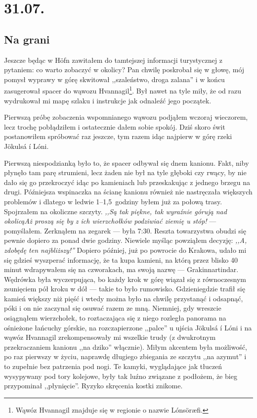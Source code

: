 \chapter*{31.07.}

\section*{Na grani}

Jeszcze będąc w Höfn zawitałem do tamtejszej informacji turystycznej z pytaniem: co warto zobaczyć w okolicy? Pan chwilę poskrobał się w głowę, mój pomysł wyprawy w górę  skwitował ,,szaleństwo, droga zalana'' i w końcu zasugerował spacer do wąwozu Hvannagil\footnote{Wąwóz Hvannagil znajduje się w regionie o nazwie Lónsöræfi.}. Był nawet na tyle miły, że od razu wydrukował mi mapę szlaku i instrukcje jak odnaleźć jego początek.

Pierwszą próbę zobaczenia wspomnianego wąwozu podjąłem wczoraj wieczorem, lecz trochę pobłądziłem i ostatecznie dałem sobie spokój. Dziś skoro świt postanowiłem spróbować raz jeszcze, tym razem idąc najpierw w górę rzeki Jökulsá í Lóni.

Pierwszą niespodzianką było to, że spacer odbywał się dnem kanionu. Fakt, niby płynęło tam parę strumieni, lecz żaden nie był na tyle głęboki czy rwący, by nie dało się go przekroczyć idąc po kamieniach lub przeskakując z jednego brzegu na drugi. Późniejsza wspinaczka na ścianę kanionu również nie nastręczała większych problemów i dlatego w ledwie \mbox{1--1,5 godziny} byłem już za połową trasy. Spojrzałem na okoliczne szczyty. \emph{,,Są tak piękne, tak wyraźnie górują nad okolicą\textellipsis Aż proszą się by z ich wierzchołków podziwiać ziemię u stóp!} --- pomyślałem. Zerknąłem na zegarek --- była 7:30. Reszta towarzystwa obudzi się pewnie dopiero za ponad dwie godziny. Niewiele myśląc powziąłem decyzję: \emph{,,A, zdobędę ten najbliższy!''} Dopiero później, już po powrocie do Krakowa, udało mi się gdzieś wyszperać informację, że ta kupa kamieni, na którą przez blisko 40 minut wdrapywałem się na czworakach, ma swoją nazwę --- Grakinnartindar. Wędrówka była wyczerpująca, bo każdy krok w górę wiązał się z równoczesnym zsunięciem pół kroku w dół --- takie to było rumowisko. Gdzieniegdzie trafił się kamień większy niż pięść i wtedy można było na chwilę przystanąć i odsapnąć, póki i on nie zaczynał się osuwać razem ze mną. Niemniej, gdy wreszcie osiągnąłem wierzchołek, to roztaczająca się z niego rozległa panorama na ośnieżone łańcuchy górskie, na rozczapierzone ,,palce'' u ujścia Jökulsá í Lóni i na wąwóz Hvannagil zrekompensowały mi wszelkie trudy (z dwukrotnym przekraczaniem kanionu ,,na dziko'' włącznie). Miłym akcentem była możliwość, po raz pierwszy w życiu, naprawdę długiego zbiegania ze szczytu ,,na azymut'' i to zupełnie bez patrzenia pod nogi. Te kamyki, wyglądające jak tłuczeń wysypywany pod tory kolejowe, były tak luźno związane z podłożem, że bieg przypominał ,,płynięcie''. Ryzyko skręcenia kostki znikome.

